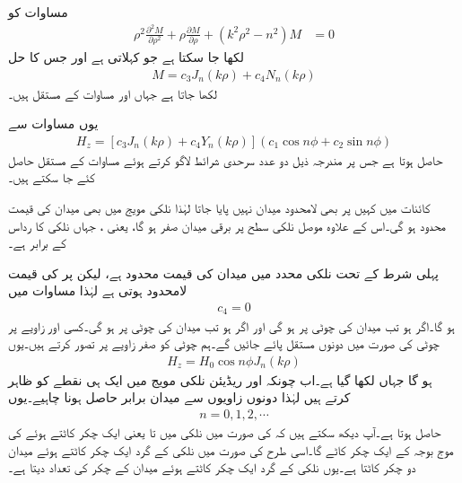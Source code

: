 مساوات  کو
\begin{align}
\rho^2 \frac{\partial^2 M}{\partial \rho^2} +\rho \frac{\partial M}{\partial \rho} +(k^2 \rho^2-n^2)M &=0
\end{align}
لکھا جا سکتا ہے جو  کہلاتی ہے اور جس کا حل
\begin{align}
M=c_3 J_n(k \rho)+c_4 N_n(k\rho)
\end{align}
لکھا جاتا ہے جہاں  اور  مساوات کے مستقل ہیں۔

یوں مساوات  سے
\begin{align}\label{مساوات_مویج_نلکی_حل_الف}
H_z=\left[c_3 J_n(k \rho)+c_4 Y_n(k\rho)\right]\left(c_1 \cos n \phi +c_2 \sin n \phi\right)
\end{align}
حاصل ہوتا ہے جس پر مندرجہ ذیل دو عدد سرحدی شرائط لاگو کرتے ہوئے مساوات کے مستقل حاصل کئے جا سکتے ہیں۔

کائنات میں کہیں پر بھی لامحدود میدان نہیں پایا جاتا لہٰذا نلکی مویج میں بھی میدان کی قیمت محدود ہو گی۔اس کے علاوہ موصل نلکی سطح پر برقی میدان صفر
 ہو گا، یعنی ، جہاں نلکی کا رداس  کے برابر ہے۔

 پہلی شرط کے تحت نلکی محدد میں میدان کی قیمت محدود ہے، لیکن  پر  کی قیمت لامحدود ہوتی ہے لہٰذا مساوات  میں 
\begin{align}
c_4=0
\end{align}   
ہو گا۔اگر  ہو تب میدان کی چوٹی  پر ہو گی  اور اگر  ہو تب میدان کی چوٹی  پر ہو گی۔کسی اور زاویے پر چوٹی کی صورت میں دونوں مستقل پائے جائیں گے۔ہم چوٹی کو صفر زاویے پر تصور کرتے ہیں۔یوں
\begin{align}\label{مساوات_مویج_نلکی_حل_ب}
H_z=H_0  \cos n \phi  J_n(k \rho)
\end{align}
ہو گا جہاں  لکھا گیا ہے۔اب چونکہ  اور  ریڈیئن نلکی مویج میں ایک ہی نقطے کو ظاہر کرتے ہیں لہٰذا دونوں زاویوں سے میدان برابر حاصل ہونا چاہیے۔یوں
\begin{align*}
n=0,1,2,\cdots
\end{align*}
حاصل ہوتا ہے۔آپ دیکھ سکتے ہیں کہ  کی صورت میں نلکی میں  تا  یعنی ایک چکر کاٹتے ہوئے   کی موج بوجہ  کے ایک چکر کاٹے گا۔اسی طرح  کی صورت میں نلکی کے گرد ایک چکر کاٹتے ہوئے میدان دو چکر کاٹتا ہے۔یوں نلکی کے گرد ایک چکر کاٹتے ہوئے میدان کے چکر کی تعداد  دیتا ہے۔

